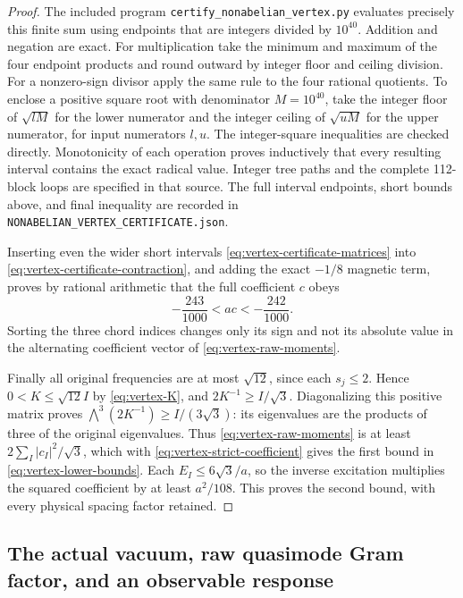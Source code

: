 \begin{proof}
The included program \texttt{certify\_nonabelian\_vertex.py}
evaluates precisely this finite sum using endpoints that are integers
divided by $10^{40}$. Addition and negation are exact. For multiplication
take the minimum and maximum of the four endpoint products and round
outward by integer floor and ceiling division. For a nonzero-sign
divisor apply the same rule to the four rational quotients. To enclose
a positive square root with denominator $M=10^{40}$, take the integer
floor of $\sqrt{lM}$ for the lower numerator and the integer ceiling
of $\sqrt{uM}$ for the upper numerator, for input numerators $l,u$.
The integer-square inequalities are checked directly. Monotonicity
of each operation proves inductively that every resulting interval
contains the exact radical value. Integer tree paths and the complete
112-block loops are specified in that source. The full interval
endpoints, short bounds above, and final inequality are recorded in
\texttt{NONABELIAN\_VERTEX\_CERTIFICATE.json}.

Inserting even the wider short intervals
\eqref{eq:vertex-certificate-matrices} into
\eqref{eq:vertex-certificate-contraction}, and adding the exact
$-1/8$ magnetic term, proves by rational arithmetic that the
full coefficient $c$ obeys
\begin{equation}\label{eq:vertex-strict-coefficient}
 -\frac{243}{1000}<ac<-\frac{242}{1000}.
\end{equation}
Sorting the three chord indices changes only its sign and not its
absolute value in the alternating coefficient vector of
\eqref{eq:vertex-raw-moments}.

Finally all original frequencies are at most $\sqrt{12}$, since
each $s_j\le2$. Hence $0<K\le\sqrt{12}I$ by
\eqref{eq:vertex-K}, and $2K^{-1}\ge I/\sqrt3$.
Diagonalizing this positive matrix proves
$\bigwedge^3(2K^{-1})\ge I/(3\sqrt3)$: its eigenvalues are
the products of three of the original eigenvalues. Thus
\eqref{eq:vertex-raw-moments} is at least
$2\sum_I|c_I|^2/\sqrt3$, which with
\eqref{eq:vertex-strict-coefficient} gives the first bound in
\eqref{eq:vertex-lower-bounds}. Each $E_I\le6\sqrt3/a$, so
the inverse excitation multiplies the squared coefficient by at
least $a^2/108$. This proves the second bound, with every physical
spacing factor retained.
\end{proof}

\subsection{The actual vacuum, raw quasimode Gram factor, and an observable response}

